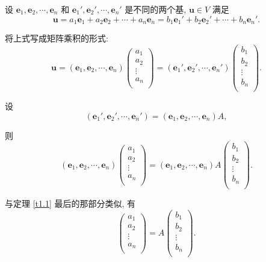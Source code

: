 \documentclass{ctexart}
\begin{document}
设 $\boldsymbol{e}_1,\boldsymbol{e}_2,\cdots,\boldsymbol{e}_n$ 和 $\boldsymbol{e}_1',\boldsymbol{e}_2',\cdots,\boldsymbol{e}_n'$ 是不同的两个基, $\boldsymbol{u}\in V$ 满足
\[\boldsymbol{u}=a_1\boldsymbol{e}_1+a_2\boldsymbol{e}_2+\cdots+a_n\boldsymbol{e}_n=b_1\boldsymbol{e}_1'+b_2\boldsymbol{e}_2'+\cdots+b_n\boldsymbol{e}_n'.\]

将上式写成矩阵乘积的形式:
\[\boldsymbol{u}=(\boldsymbol{e}_1,\boldsymbol{e}_2,\cdots,\boldsymbol{e}_n)\begin{pmatrix}
    a_1 \\
    a_2 \\
    \vdots \\
    a_n \\
\end{pmatrix}=(\boldsymbol{e}_1',\boldsymbol{e}_2',\cdots,\boldsymbol{e}_n')\begin{pmatrix}
    b_1 \\
    b_2 \\
    \vdots \\
    b_n \\
\end{pmatrix}.\]

设
\[(\boldsymbol{e}_1',\boldsymbol{e}_2',\cdots,\boldsymbol{e}_n')=(\boldsymbol{e}_1,\boldsymbol{e}_2,\cdots,\boldsymbol{e}_n)A,\]

则
\[(\boldsymbol{e}_1,\boldsymbol{e}_2,\cdots,\boldsymbol{e}_n)\begin{pmatrix}
    a_1 \\
    a_2 \\
    \vdots \\
    a_n \\
\end{pmatrix}=(\boldsymbol{e}_1,\boldsymbol{e}_2,\cdots,\boldsymbol{e}_n)A\begin{pmatrix}
    b_1 \\
    b_2 \\
    \vdots \\
    b_n \\
\end{pmatrix}.\]

与定理 \ref{t1.1} 最后的那部分类似, 有
\[\begin{pmatrix}
    a_1 \\
    a_2 \\
    \vdots \\
    a_n \\
\end{pmatrix}=A\begin{pmatrix}
    b_1 \\
    b_2 \\
    \vdots \\
    b_n \\
\end{pmatrix}.\]
\end{document}
